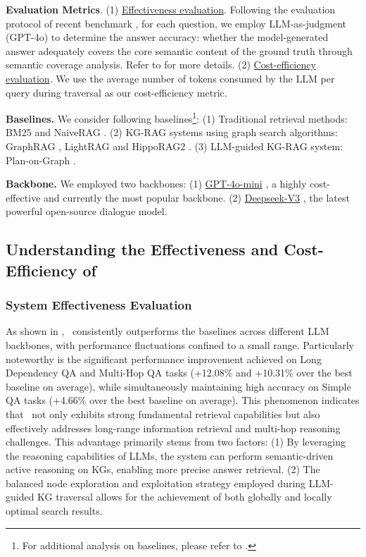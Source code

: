\textbf{Evaluation Metrics}. (1) \uline{Effectiveness evaluation}. Following the evaluation protocol of recent benchmark \cite{Benchmark1}, for each question, we employ LLM-as-judgment (GPT-4o) \cite{llm-as-a-judge} to determine the answer accuracy: whether the model-generated answer adequately covers the core semantic content of the ground truth through semantic coverage analysis. Refer to  for more details.  (2) \uline{Cost-efficiency evaluation}. We use the average number of tokens consumed by the LLM per query during traversal as our cost-efficiency metric.

\textbf{Baselines.} We consider following baselines\footnote{For additional analysis on baselines, please refer to .}: (1) Traditional retrieval methods: BM25 \cite{BM25} and NaiveRAG \cite{Base2}. (2) KG-RAG systems using graph search algorithms: GraphRAG \cite{Main3}, LightRAG \cite{Main2} and HippoRAG2 \cite{Main6}. (3) LLM-guided KG-RAG system: Plan-on-Graph \cite{KG1}.

\textbf{Backbone.} We employed two backbones: (1) \uline{GPT-4o-mini} \cite{gpt-4o-mini}, a highly cost-effective and currently the most popular backbone. (2) \uline{Deepseek-V3} \cite{deepseek-v3}, the latest powerful open-source dialogue model.



\subsection{Understanding the Effectiveness and Cost-Efficiency of \ours}
\label{sec::evaluation-understanding1}

\subsubsection{System Effectiveness Evaluation}
As shown in , \ours~consistently outperforms the baselines across different LLM backbones, with performance fluctuations confined to a small range. Particularly noteworthy is the significant performance improvement achieved on Long Dependency QA and Multi-Hop QA tasks (+12.08\% and +10.31\% over the best baseline on average), while simultaneously maintaining high accuracy on Simple QA tasks (+4.66\% over the best baseline on average). This phenomenon indicates that \ours~not only exhibits strong fundamental retrieval capabilities but also effectively addresses long-range information retrieval and multi-hop reasoning challenges. This advantage primarily stems from two factors: (1) By leveraging the reasoning capabilities of LLMs, the system can perform semantic-driven active reasoning on KGs, enabling more precise answer retrieval. (2) The balanced node exploration and exploitation strategy employed during LLM-guided KG traversal allows for the achievement of both globally and locally optimal search results.


